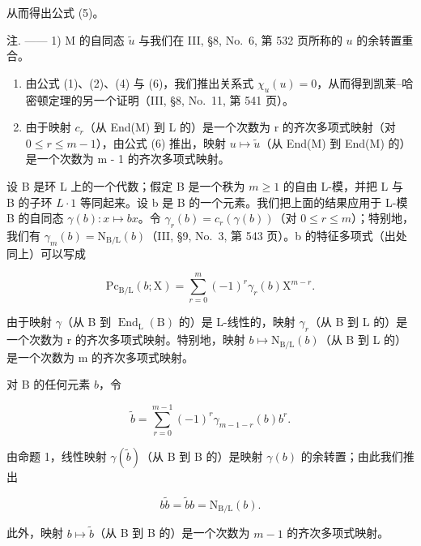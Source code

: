 从而得出公式 (5)。

注. —— 1) M 的自同态 \(\widetilde{u}\) 与我们在 III, §8, No.~6, 第 532 页所称的 \(u\) 的余转置重合。

\begin{enumerate}
\def\labelenumi{\arabic{enumi})}
\setcounter{enumi}{1}
\item
  由公式 (1)、(2)、(4) 与 (6)，我们推出关系式 \(\chi_u(u) = 0\)，从而得到凯莱–哈密顿定理的另一个证明（III, §8, No.~11, 第 541 页）。
\item
  由于映射 \(c_{r}\)（从 End(M) 到 L 的）是一个次数为 r 的齐次多项式映射（对 \(0 \leqslant r \leqslant m - 1\)），由公式 (6) 推出，映射 \(u \mapsto \widetilde{u}\)（从 End(M) 到 End(M) 的）是一个次数为 m - 1 的齐次多项式映射。
\end{enumerate}

设 B 是环 L 上的一个代数；假定 B 是一个秩为 \(m \geqslant 1\) 的自由 L-模，并把 L 与 B 的子环 \(L \cdot 1\) 等同起来。设 b 是 B 的一个元素。我们把上面的结果应用于 L-模 B 的自同态 \(\gamma(b) : x \mapsto bx\)。令 \(\gamma_{r}(b) = c_{r}(\gamma(b))\)（对 \(0 \leqslant r \leqslant m\)）；特别地，我们有 \(\gamma_{m}(b) = \mathrm{N}_{\mathrm{B/L}}(b)\)（III, §9, No.~3, 第 543 页）。b 的特征多项式（出处同上）可以写成

\[
\mathrm{Pc} _ {\mathrm{B/L}} (b; \mathrm{X}) = \sum_ {r = 0} ^ {m} (- 1) ^ {r} \gamma_ {r} (b) \mathrm{X} ^ {m - r}.\tag{16}
\]

由于映射 \(\gamma\)（从 B 到 \(\operatorname{End}_{\mathrm{L}}(\mathrm{B})\) 的）是 L-线性的，映射 \(\gamma_{r}\)（从 B 到 L 的）是一个次数为 r 的齐次多项式映射。特别地，映射 \(b \mapsto \mathrm{N}_{\mathrm{B}/\mathrm{L}}(b)\)（从 B 到 L 的）是一个次数为 m 的齐次多项式映射。

对 B 的任何元素 \(b\)，令

\[
\widetilde {b} = \sum_ {r = 0} ^ {m - 1} (- 1) ^ {r} \gamma_ {m - 1 - r} (b) b ^ {r}.\tag{17}
\]

由命题 1，线性映射 \(\gamma (\widetilde{b})\)（从 B 到 B 的）是映射 \(\gamma (b)\) 的余转置；由此我们推出

\[
b \widetilde {b} = \widetilde {b} b = \mathrm{N} _ {\mathrm{B/L}} (b).\tag{18}
\]

此外，映射 \(b \mapsto \widetilde{b}\)（从 B 到 B 的）是一个次数为 \(m - 1\) 的齐次多项式映射。

